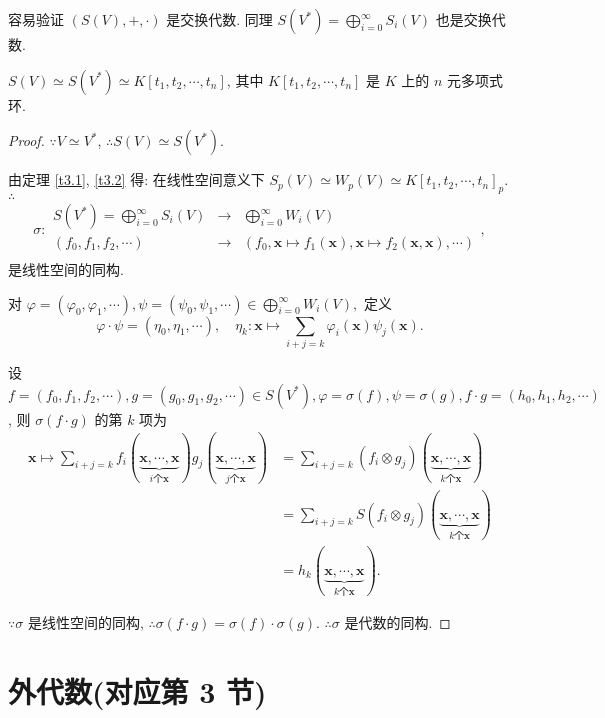 \documentclass{ctexart}
\begin{document}
容易验证 $(S(V),+,\cdot)$ 是交换代数. 同理 $S(V^*)=\bigoplus\limits_{i=0}^\infty S_i(V)$ 也是交换代数.
\begin{theorem}
    $S(V)\simeq S(V^*)\simeq K[t_1,t_2,\cdots,t_n]$, 其中 $K[t_1,t_2,\cdots,t_n]$ 是 $K$ 上的 $n$ 元多项式环.
\end{theorem}
\begin{proof}
    $\because V\simeq V^*$, $\therefore S(V)\simeq S(V^*)$.

    由定理 \ref{t3.1}, \ref{t3.2} 得: 在线性空间意义下 $S_p(V)\simeq W_p(V)\simeq K[t_1,t_2,\cdots,t_n]_p$. $\therefore$
    \[\sigma:\begin{array}{rcl}
        S(V^*)=\bigoplus\limits_{i=0}^\infty S_i(V) & \rightarrow & \bigoplus\limits_{i=0}^\infty W_i(V) \\
        (f_0,f_1,f_2,\cdots) & \rightarrow & (f_0,\boldsymbol{x}\mapsto f_1(\boldsymbol{x}),\boldsymbol{x}\mapsto f_2(\boldsymbol{x},\boldsymbol{x}),\cdots) \\
    \end{array},\]
    是线性空间的同构.

    对 $\varphi=(\varphi_0,\varphi_1,\cdots),\psi=(\psi_0,\psi_1,\cdots)\in\bigoplus\limits_{i=0}^\infty W_i(V),$ 定义
    \[\varphi\cdot\psi=(\eta_0,\eta_1,\cdots),\quad\eta_k:\boldsymbol{x}\mapsto\sum\limits_{i+j=k}\varphi_i(\boldsymbol{x})\psi_j(\boldsymbol{x}).\]

    设 $f=(f_0,f_1,f_2,\cdots),g=(g_0,g_1,g_2,\cdots)\in S(V^*),\varphi=\sigma(f),\psi=\sigma(g),f\cdot g=(h_0,h_1,h_2,\cdots)$, 则 $\sigma(f\cdot g)$ 的第 $k$ 项为
    \begin{align*}
        \boldsymbol{x}\mapsto\sum\limits_{i+j=k}f_i(\underbrace{\boldsymbol{x},\cdots,\boldsymbol{x}}_{i\text{个}\boldsymbol{x}})g_j(\underbrace{\boldsymbol{x},\cdots,\boldsymbol{x}}_{j\text{个}\boldsymbol{x}}) & =\sum\limits_{i+j=k}(f_i\otimes g_j)(\underbrace{\boldsymbol{x},\cdots,\boldsymbol{x}}_{k\text{个}\boldsymbol{x}}) \\
        & =\sum\limits_{i+j=k}S(f_i\otimes g_j)(\underbrace{\boldsymbol{x},\cdots,\boldsymbol{x}}_{k\text{个}\boldsymbol{x}}) \\
        & =h_k(\underbrace{\boldsymbol{x},\cdots,\boldsymbol{x}}_{k\text{个}\boldsymbol{x}}).
    \end{align*}

    $\because\sigma$ 是线性空间的同构, $\therefore\sigma(f\cdot g)=\sigma(f)\cdot\sigma(g)$. $\therefore\sigma$ 是代数的同构.
\end{proof}
\section{外代数(对应第 3 节)}
\end{document}

